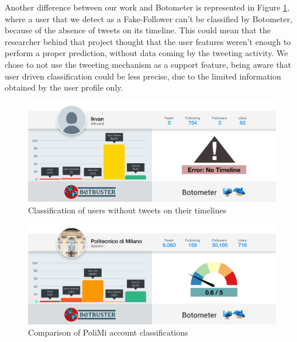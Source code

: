Another difference between our work and Botometer is represented in Figure \ref{fig:fake}, where a user that we detect as a Fake-Follower can't be classified by Botometer, because of the absence of tweets on its timeline. This could mean that the researcher behind that project thought that the user features weren't enough to perform a proper prediction, without data coming by the tweeting activity.
We chose to not use the tweeting mechanism as a support feature, being aware that user driven classification could be less precise, due to the limited information obtained by the user profile only.
\begin{figure}[htp!]
	\begin{center}
		\includegraphics[width=\columnwidth]{chapter7/figure/fake_follower.png}\par
	\end{center}
	\caption{Classification of users without tweets on their timelines}
	\label{fig:fake}
\end{figure}

\begin{figure}[htp!]
	\begin{center}
		\includegraphics[width=\columnwidth]{chapter7/figure/polimi.png}\par
	\end{center}
	\caption{Comparison of PoliMi account classifications}
	\label{fig:polimi}
\end{figure}

